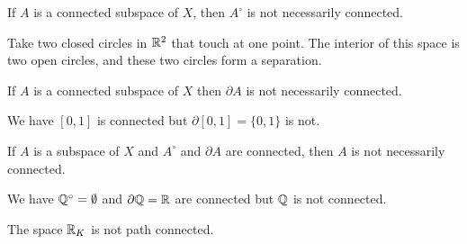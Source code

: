 \begin{example}
    If $A$ is a connected subspace of $X$, then $A^\circ$ is not necessarily connected.

    Take two closed circles in $\mathbb{R}^2$ that touch at one point. The interior of this space is
    two open circles, and these two circles form a separation.
\end{example}

\begin{example}
    If $A$ is a connected subspace of $X$ then $\partial A$ is not necessarily connected.

    We have $[0,1]$ is connected but $\partial [0,1] = \{ 0, 1 \}$ is not.
\end{example}

\begin{example}
    If $A$ is a subspace of $X$ and $A^\circ$ and $\partial A$ are connected, then $A$ is not necessarily connected.

    We have $\mathbb{Q}^\circ = \emptyset$ and $\partial \mathbb{Q} = \mathbb{R}$ are connected but $\mathbb{Q}$ is not connected.
\end{example}

\begin{example}
    The space $\mathbb{R}_K$ is not path connected.
\end{example}


